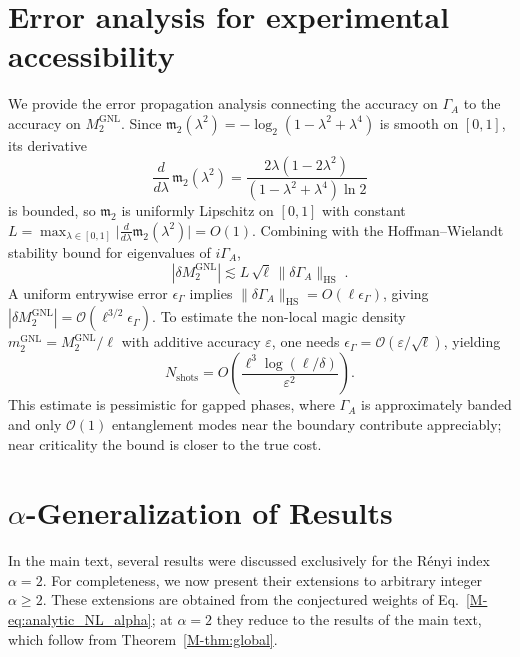 \documentclass[aps,prl,twocolumn,superscriptaddress,reprint,longbibliography,nofootinbib]{revtex4-2}
\begin{document}
\section{Error analysis for experimental accessibility}
\label{app:experimental}
We provide the error propagation analysis connecting the accuracy on $\Gamma_A$ to the accuracy on $M_2^{\mathrm{GNL}}$.
Since $\mathfrak{m}_2(\lambda^2) = -\log_2(1-\lambda^2+\lambda^4)$ is smooth on $[0,1]$, its derivative
\begin{equation}
    \frac{d}{d\lambda}\,\mathfrak{m}_2(\lambda^2) = \frac{2\lambda(1-2\lambda^2)}{(1-\lambda^2+\lambda^4)\ln 2}
\end{equation}
is bounded, so $\mathfrak{m}_2$ is uniformly Lipschitz on $[0,1]$ with constant $L = \max_{\lambda \in [0,1]} \bigl|\frac{d}{d\lambda}\mathfrak{m}_2(\lambda^2)\bigr| = O(1)$.
Combining with the Hoffman--Wielandt stability bound for eigenvalues of $i\Gamma_A$,
\begin{equation}
    |\delta M_2^{\mathrm{GNL}}| \lesssim L\,\sqrt{\ell}\,\|\delta\Gamma_A\|_{\mathrm{HS}}\;.
\end{equation}
A uniform entrywise error $\epsilon_\Gamma$ implies $\|\delta\Gamma_A\|_{\mathrm{HS}} = O(\ell \epsilon_\Gamma)$, giving $|\delta M_2^{\mathrm{GNL}}| = \mathcal{O}(\ell^{3/2}\epsilon_\Gamma)$.
To estimate the non-local magic density $m_2^{\mathrm{GNL}} = M_2^{\mathrm{GNL}}/\ell$ with additive accuracy $\varepsilon$, one needs $\epsilon_\Gamma = \mathcal{O}(\varepsilon/\sqrt{\ell})$, yielding
\begin{equation}
    N_{\mathrm{shots}} = O\!\left(\frac{\ell^3\log(\ell/\delta)}{\varepsilon^2}\right).
\end{equation}
This estimate is pessimistic for gapped phases, where $\Gamma_A$ is approximately banded and only $\mathcal{O}(1)$ entanglement modes near the boundary contribute appreciably; near criticality the bound is closer to the true cost.

\section{$\alpha$-Generalization of Results}
\label{Sec:generaliz}

In the main text, several results were discussed exclusively for the Rényi index $\alpha = 2$. For completeness, we now present their extensions to arbitrary integer $\alpha \ge 2$. These extensions are obtained from the conjectured weights of Eq.~\eqref{M-eq:analytic_NL_alpha}; at $\alpha=2$ they reduce to the results of the main text, which follow from Theorem~\ref{M-thm:global}.
\end{document}
